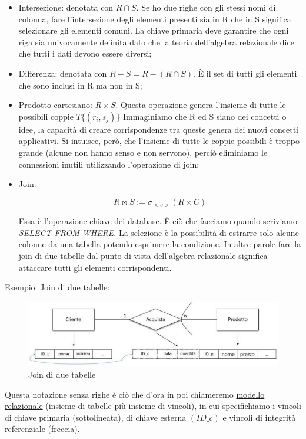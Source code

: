 \begin{itemize}
\begin{itemize}
\item{Intersezione}: denotata con $R \cap S$. Se ho due righe con gli stessi nomi di colonna,  fare l'intersezione degli elementi presenti sia in R che in S significa selezionare gli elementi comuni. La chiave primaria deve garantire che ogni riga sia univocamente definita dato che la teoria dell'algebra relazionale dice che tutti i dati devono essere diversi;

\item{Differenza}: denotata con $R-S = R-(R\cap S)$. È il set di tutti gli elementi che sono inclusi in R ma non in S;

\item{Prodotto cartesiano}: $R \times S$.  Questa operazione genera l'insieme di tutte le possibili coppie $T\{(r_i,s_j)\}$ Immaginiamo che R ed S siano dei concetti o idee, la capacità di creare corrispondenze tra queste genera dei nuovi concetti applicativi. Si intuisce, però, che l'insieme di tutte le coppie possibili è troppo grande (alcune non hanno senso e non servono), perciò eliminiamo le connessioni inutili utilizzando l'operazione di join;

\item{Join}:

\[
	R \Join S := \sigma_{<c>}(R \times C)
\]

Essa è l'operazione chiave dei database. È ciò che facciamo quando scriviamo \textit{SELECT FROM WHERE}. La selezione è la possibilità di estrarre solo alcune colonne da una tabella potendo esprimere la condizione. In altre parole fare la join di due tabelle dal punto di vista dell'algebra relazionale significa attaccare tutti gli elementi corrispondenti. 

\end{itemize}

\underline{Esempio}: Join di due tabelle:

\begin{center}
\begin{figure}[H]
\centering
\includegraphics[scale=0.8]{figures/join.png}
\caption{Join di due tabelle} 
\end{figure}
\end{center}

Questa notazione senza righe è ciò che d'ora in poi chiameremo \underline{modello relazionale} (insieme di tabelle più insieme di vincoli), in cui specifichiamo i vincoli di chiave primaria (sottolineata), di chiave esterna $(ID\_c)$ e vincoli di integrità referenziale (freccia).

\end{itemize}


